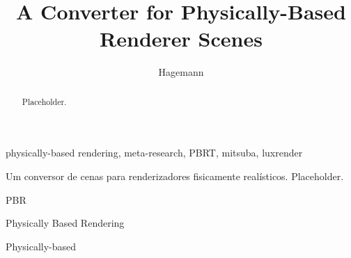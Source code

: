 \documentclass[cic,tc,english]{iiufrgs}
\title{A Converter for Physically-Based Renderer Scenes}
\author{Hagemann}{Luiza de Azambuja}
\begin{document}
\maketitle




\begin{abstract}
    Placeholder.
\end{abstract}{physically-based rendering, meta-research, PBRT, mitsuba, luxrender}

\begin{englishabstract}{Um conversor de cenas para renderizadores fisicamente realísticos.}
    Placeholder.
\end{englishabstract}

\listoffigures


\begin{listofabbrv}{PBR}
    \item[PBR] Physically Based Rendering
    \item[PB] Physically-based
\end{listofabbrv}


\tableofcontents











\end{document}
